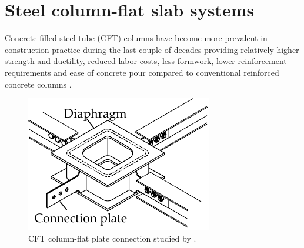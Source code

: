 \section{Steel column-flat slab systems}\label{cft}
Concrete filled steel tube (CFT) columns have become more prevalent in construction practice during the last couple of decades providing relatively higher strength and ductility\citep{MORINO1998336}, reduced labor costs, less formwork, lower reinforcement requirements and ease of concrete pour compared to conventional reinforced concrete columns \citep{yan2011,wang2014}. 


\begin{figure}\centering
    \includegraphics[width=\columnwidth]{Figures/s2004f3.pdf}
    \caption{CFT column-flat plate connection studied by \cite{satoh2004experimental,yamaguchi2008experimental}.}
    \label{s2004f3}
    \end{figure}
